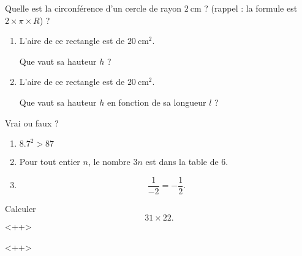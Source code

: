 \begin{MentalActivity}

    \begin{mental}
        Quelle est la circonférence d'un cercle de rayon \( \SI{2}{\centi\meter}\) ? (rappel : la formule est \( 2\times\pi\times R\)) ?
    \end{mental}

    \begin{mental}
        \begin{enumerate}
            \item
                L'aire de ce rectangle est de \(\SI{20}{\centi\meter\squared}\).
        \begin{center}
           
        \end{center}
        Que vaut sa hauteur \( h\) ?
            \item
                L'aire de ce rectangle est de \(\SI{20}{\centi\meter\squared}\).
                \begin{center}
                    
                \end{center}
                Que vaut sa hauteur \( h\) en fonction de sa longueur \( l\) ?
        \end{enumerate}
    \end{mental}

    \begin{mental}
        Vrai ou faux ?
        \begin{enumerate}
            \item
                \( 8.7^2>87\)
            \item
                Pour tout entier \( n\), le nombre \( 3n\) est dans la table de \( 6\).
            \item
                \begin{equation}
                    \frac{1}{ -2 }=-\frac{1}{ 2 }.
                \end{equation}
        \end{enumerate}
    \end{mental}
    
\end{MentalActivity}
\begin{MentalActivity}
    \begin{mental}
        Calculer
        \begin{equation}
            31\times 22.
        \end{equation}
        <++>
    \end{mental}
    <++>
\end{MentalActivity}



